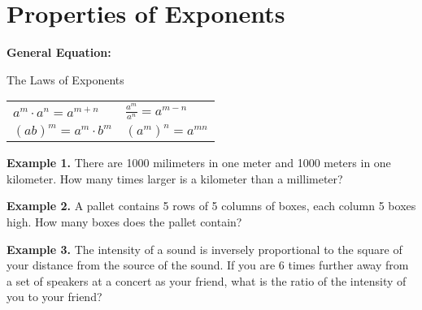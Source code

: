 \section{Properties of Exponents}

\bigskip
\textbf{General Equation:} 

\centerline{The Laws of Exponents}

\begin{spacing}{2}
\begin{tabularx}{\textwidth}{*2{@{}>{\centering\arraybackslash}X}}
$a^m\cdot a^n = a^{m+n}$ & $\frac{a^m}{a^n}=a^{m-n}$\\
$(ab)^m=a^m\cdot b^m$ & $(a^m)^n=a^{mn}$
\end{tabularx}
\end{spacing}

\vfill
\textbf{Example 1.} There are 1000 milimeters in one meter and 1000 meters in one kilometer. How many times larger is a kilometer than a millimeter?

\vfill
\textbf{Example 2.} A pallet contains 5 rows of 5 columns of boxes, each column 5 boxes high. How many boxes does the pallet contain?

\vfill
\textbf{Example 3.} The intensity of a sound is inversely proportional to the square of your distance from the source of the sound. If  you are 6 times further away from a set of speakers at a concert as your friend, what is the ratio of the intensity of you to your friend?

